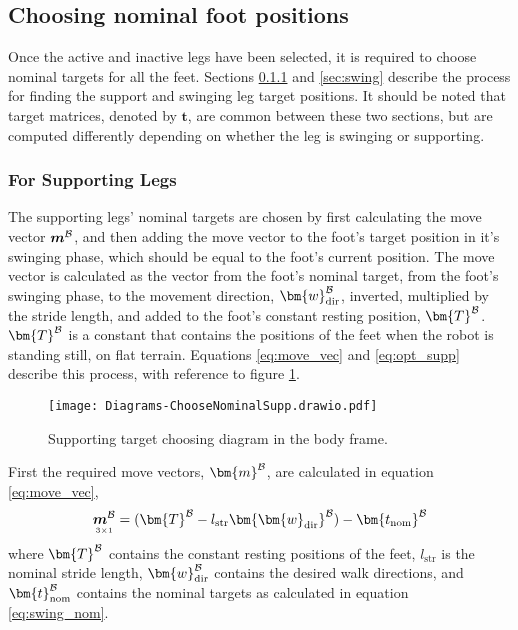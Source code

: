         \subsection{Choosing nominal foot positions}\label{sec:choosing_nominal} 
            Once the active and inactive legs have been selected, it is required to choose nominal targets for all the feet. Sections \ref{sec:support} and \ref{sec:swing}
            describe the process for finding the support and swinging leg target positions. It should be noted that target matrices, denoted by \(\bm{t}\), are common between these two sections, but are computed differently depending on whether the leg is swinging or supporting.
                
            \subsubsection{For Supporting Legs} \label{sec:support}
                The supporting legs' nominal targets are chosen by first calculating the move vector \(\boldsymbol{m}^\fbody\), and then adding the move vector to the foot's target position in it's swinging phase, which should be equal to the foot's current position. The move vector is calculated as the vector from the foot's nominal target, from the foot's swinging phase, to the movement direction, \(\bm{w}_\text{dir}^\fbody\), inverted, multiplied by the stride length, and added to the foot's constant resting position, \(\bm{T}^\fbody\). \(\bm{T}^\fbody\) is  a constant that contains the positions of the feet when the robot is standing still, on flat terrain.
                Equations \ref{eq:move_vec} and \ref{eq:opt_supp} describe this process, with reference to figure \ref{fig:supp_targ}.
                \begin{figure}[h]
                    \centering
                    \texttt{[image: Diagrams-ChooseNominalSupp.drawio.pdf]}
                    \caption{Supporting target choosing diagram in the body frame.} 
                    \label{fig:supp_targ}
                \end{figure}

                \noindent
                First the required move vectors, \(\bm{m} ^\fbody\), are calculated in equation \ref{eq:move_vec},
                \begin{equation}\label{eq:move_vec}
                    \mdim{\boldsymbol{m}^\fbody}{3}{1} =  (\bm{T}^\fbody - l_\text{str} \bm{\bm{w}_\text{dir}}^\fbody) - \bm{t_\text{nom}}^\fbody
                \end{equation}
                where \(\bm{T}^\fbody\) contains the constant resting positions of the feet, \(l_\text{str}\) is the nominal stride length, \(\bm{w}_\text{dir}^\fbody\)
                contains the desired walk directions, and \(\bm{t}_\text{nom} ^\fbody\) contains the nominal targets as calculated in
                equation \ref{eq:swing_nom}.

